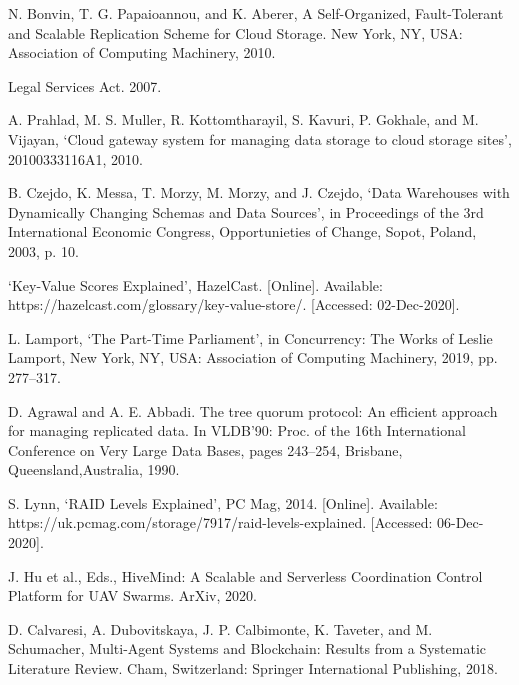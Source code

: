 \documentclass{UoYCSproject}
\begin{document}
\begin{thebibliography}{100}
N. Bonvin, T. G. Papaioannou, and K. Aberer, A Self-Organized, Fault-Tolerant and Scalable Replication Scheme for Cloud Storage. New York, NY, USA: Association of Computing Machinery, 2010.

Legal Services Act. 2007.

A. Prahlad, M. S. Muller, R. Kottomtharayil, S. Kavuri, P. Gokhale, and M. Vijayan, ‘Cloud gateway system for managing data storage to cloud storage sites’, 20100333116A1, 2010.

B. Czejdo, K. Messa, T. Morzy, M. Morzy, and J. Czejdo, ‘Data Warehouses with Dynamically Changing Schemas and Data Sources’, in Proceedings of the 3rd International Economic Congress, Opportunieties of Change, Sopot, Poland, 2003, p. 10.

‘Key-Value Scores Explained’, HazelCast. [Online]. Available: https://hazelcast.com/glossary/key-value-store/. [Accessed: 02-Dec-2020].

L. Lamport, ‘The Part-Time Parliament’, in Concurrency: The Works of Leslie Lamport, New York, NY, USA: Association of Computing Machinery, 2019, pp. 277–317.

D. Agrawal and A. E. Abbadi. The tree quorum protocol: An efficient approach for managing replicated data. In VLDB’90: Proc. of the 16th International Conference on Very Large Data Bases, pages 243–254, Brisbane, Queensland,Australia, 1990.

S. Lynn, ‘RAID Levels Explained’, PC Mag, 2014. [Online]. Available: https://uk.pcmag.com/storage/7917/raid-levels-explained. [Accessed: 06-Dec-2020].

J. Hu et al., Eds., HiveMind: A Scalable and Serverless Coordination Control Platform for UAV Swarms. ArXiv, 2020.

D. Calvaresi, A. Dubovitskaya, J. P. Calbimonte, K. Taveter, and M. Schumacher, Multi-Agent Systems and Blockchain: Results from a Systematic Literature Review. Cham, Switzerland: Springer International Publishing, 2018.

\end{thebibliography}
\end{document}
